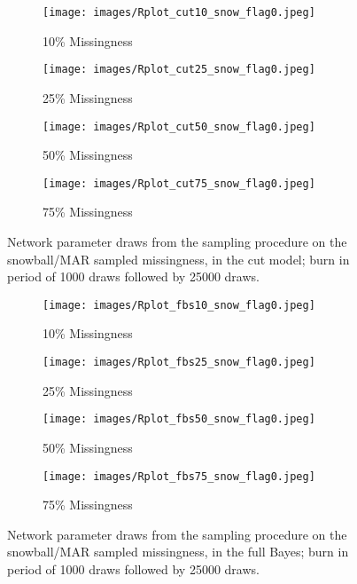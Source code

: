 \documentclass{article}
\begin{document}
\begin{figure}[h]
	\begin{subfigure}[b]{0.5\linewidth}
		\centering
		\texttt{[image: images/Rplot\_cut10\_snow\_flag0.jpeg]}
		\caption{10\% Missingness}
		\vspace{4ex}
	\end{subfigure}%
	\begin{subfigure}[b]{0.5\linewidth}
		\centering
		\texttt{[image: images/Rplot\_cut25\_snow\_flag0.jpeg]}
		\caption{25\% Missingness}
		\vspace{4ex}
	\end{subfigure}
	\begin{subfigure}[b]{0.5\linewidth}
		\centering
		\texttt{[image: images/Rplot\_cut50\_snow\_flag0.jpeg]}
		\caption{50\% Missingness}
	\end{subfigure}
	\begin{subfigure}[b]{0.5\linewidth}
		\centering
		\texttt{[image: images/Rplot\_cut75\_snow\_flag0.jpeg]}
		\caption{75\% Missingness}
\end{subfigure}
	\caption{Network parameter draws from the sampling procedure on the snowball/MAR sampled missingness, in the cut model; burn in period of 1000 draws followed by 25000 draws.}
	\label{fig:rhoestimatesCUTsnowF0}
\end{figure}

\begin{figure}[h]
	\begin{subfigure}[b]{0.5\linewidth}
		\centering
		\texttt{[image: images/Rplot\_fbs10\_snow\_flag0.jpeg]}
		\caption{10\% Missingness}
	\end{subfigure}
	\begin{subfigure}[b]{0.5\linewidth}
		\centering
		\texttt{[image: images/Rplot\_fbs25\_snow\_flag0.jpeg]}
		\caption{25\% Missingness}
	\end{subfigure}
	\begin{subfigure}[b]{0.5\linewidth}
		\centering
		\texttt{[image: images/Rplot\_fbs50\_snow\_flag0.jpeg]}
		\caption{50\% Missingness}
	\end{subfigure}
	\begin{subfigure}[b]{0.5\linewidth}
		\centering
		\texttt{[image: images/Rplot\_fbs75\_snow\_flag0.jpeg]}
		\caption{75\% Missingness}
	\end{subfigure}
	\caption{Network parameter draws from the sampling procedure on the snowball/MAR sampled missingness, in the full Bayes; burn in period of 1000 draws followed by 25000 draws.}
	\label{fig:rhoestimatesFBMsnowF0}
\end{figure}
\end{document}
